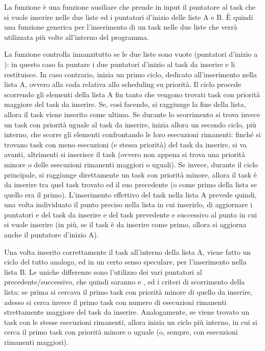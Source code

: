         La funzione  è una funzione ausiliare che prende in input il puntatore al task che si vuole inserire nelle due liste ed i puntatori d'inizio delle liste A e B. È quindi una funzione generica per l'inserimento di un task nelle due liste che verrà utilizzata più volte all'interno del programma.
        
        La funzione controlla innanzitutto se le due liste sono vuote (puntatori d'inizio a ): in questo caso fa puntare i due puntatori d'inizio al task da inserire e li restituisce. In caso contrario, inizia un primo ciclo, dedicato all'inserimento nella lista A, ovvero alla coda relativa allo scheduling su priorità. Il ciclo procede scorrendo gli elementi della lista A fin tanto che vengono trovati task con priorità maggiore del task da inserire. Se, così facendo, si raggiunge la fine della lista, allora il task viene inserito come ultimo. Se durante lo scorrimento si trova invece un task con priorità uguale al task da inserire, inizia allora un secondo ciclo, più interno, che scorre gli elementi confrontando le loro esecuzioni rimanenti: finché si trovano task con meno esecuzioni (e stessa priorità) del task da inserire, si va avanti, altrimenti si inserisce il task (ovvero non appena si trova una priorità minore o delle esecuzioni rimanenti maggiori o uguali). Se invece, durante il ciclo principale, si raggiunge direttamente un task con priorità minore, allora il task è da inserire tra quel task trovato ed il suo precedente (o come primo della lista se quello era il primo). L'inserimento effettivo del task nella lista A prevede quindi, una volta individuato il punto preciso nella lista in cui inserirlo, di aggiornare i puntatori  e  del task da inserire e del task prevedente e successivo al punto in cui si vuole inserire (in più, se il task è da inserire come primo, allora si aggiorna anche il puntatore d'inizio A).
        
        Una volta inserito correttamente il task all'interno della lista A, viene fatto un ciclo del tutto analogo, ed in un certo senso speculare, per l'inserimento nella lista B. Le uniche differenze sono l'utilizzo dei vari puntatori al precedente/successivo, che quindi saranno  e , ed i criteri di scorrimento della lista: se prima si cercava il primo task con priorità minore di quello da inserire, adesso si cerca invece il primo task con numero di esecuzioni rimanenti strettamente maggiore del task da inserire. Analogamente, se viene trovato un task con le stesse esecuzioni rimanenti, allora inizia un ciclo più interno, in cui si cerca il primo task con priorità minore o uguale (o, sempre, con esecuzioni rimanenti maggiori).
        

